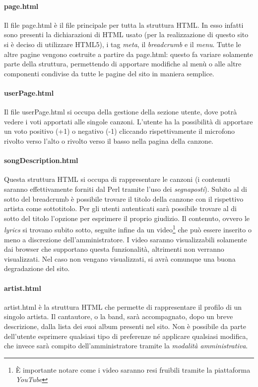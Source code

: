 \paragraph*{page.html} Il file page.html \`e il file principale per tutta la struttura HTML. In esso infatti sono presenti la dichiarazioni di HTML usato (per la realizzazione di questo sito si \`e deciso di utilizzare HTML5), i tag \textit{meta}, il \textit{breadcrumb} e il \textit{menu}. Tutte le altre pagine vengono costruite a partire da page.html: questo fa variare solamente parte della struttura, permettendo di apportare modifiche al men\`u o alle altre componenti condivise da tutte le pagine del sito in maniera semplice.

\paragraph*{userPage.html} Il file userPage.html si occupa della gestione della sezione utente, dove potrà vedere i voti apportati alle singole canzoni. L'utente ha la possibilità di apportare un voto positivo (+1) o negativo (-1) cliccando rispettivamente il microfono rivolto verso l'alto o rivolto verso il basso nella pagina della canzone.

\paragraph*{songDescription.html} Questa struttura HTML si occupa di rappresentare le canzoni (i contenuti saranno effettivamente forniti dal Perl tramite l'uso dei \textit{segnaposti}). Subito al di sotto del breadcrumb è possibile trovare il titolo della canzone con il rispettivo artista come sottotitolo. Per gli utenti autenticati sarà possibile trovare al di sotto del titolo l'opzione per esprimere il proprio giudizio. Il contenuto, ovvero le \textit{lyrics} si trovano subito sotto, seguite infine da un video\footnote{È importante notare come i video saranno resi fruibili tramite la piattaforma \textit{YouTube}} che può essere inserito o meno a discrezione dell'amministratore. I video saranno visualizzabili solamente dai browser che supportano questa funzionalità, altrimenti non verranno visualizzati. Nel caso non vengano visualizzati, si avr\`a comunque una buona degradazione del sito.

\paragraph*{artist.html} artist.html è la struttura HTML che permette di rappresentare il profilo di un singolo artista. Il cantautore, o la band, sarà accompagnato, dopo un breve descrizione, dalla lista dei suoi album presenti nel sito. Non è possibile da parte dell'utente esprimere qualsiasi tipo di preferenze né applicare qualsiasi modifica, che invece sarà compito dell'amministratore tramite la \textit{modalità amministrativa}.

